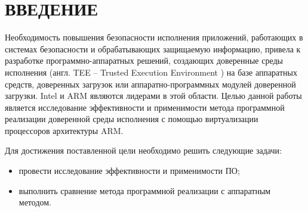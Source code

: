 \section*{ВВЕДЕНИЕ}

Необходимость повышения безопасности исполнения приложений, работающих в системах безопасности и обрабатывающих защищаемую информацию, привела к разработке программно-аппаратных решений, создающих доверенные среды исполнения (англ. TEE -- Trusted Execution Environment \cite{tee}) на базе аппаратных средств, доверенных загрузок или аппаратно-программных модулей доверенной загрузки. Intel \cite{intel} и ARM \cite{arm} являются лидерами в этой области. Целью данной работы является исследование эффективности и применимости метода программной реализации доверенной среды исполнения с помощью виртуализации процессоров архитектуры ARM.

Для достижения поставленной цели необходимо решить следующие задачи:

\begin{itemize}
	\item провести исследование эффективности и применимости ПО;
	\item выполнить сравнение метода программной реализации с аппаратным методом.
\end{itemize}

\pagebreak
